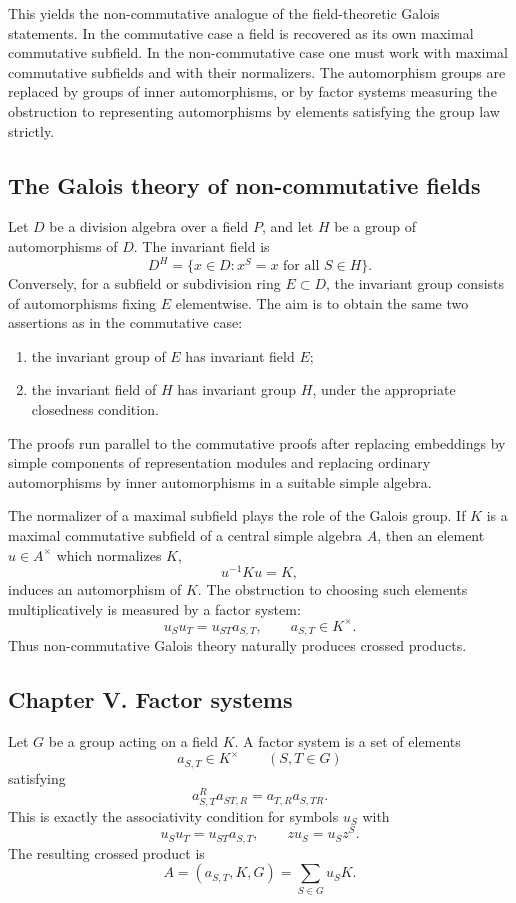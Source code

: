 \documentclass[12pt]{article}
\begin{document}
This yields the non-commutative analogue of the field-theoretic Galois statements. In the commutative case a field is recovered as its own maximal commutative subfield. In the non-commutative case one must work with maximal commutative subfields and with their normalizers. The automorphism groups are replaced by groups of inner automorphisms, or by factor systems measuring the obstruction to representing automorphisms by elements satisfying the group law strictly.

\subsection{The Galois theory of non-commutative fields}

Let \(D\) be a division algebra over a field \(P\), and let \(H\) be a group of automorphisms of \(D\). The invariant field is
\[
  D^H=\{x\in D:x^S=x\text{ for all }S\in H\}.
\]
Conversely, for a subfield or subdivision ring \(E\subset D\), the invariant group consists of automorphisms fixing \(E\) elementwise. The aim is to obtain the same two assertions as in the commutative case:
\begin{enumerate}[label=\arabic*.]
\item the invariant group of \(E\) has invariant field \(E\);
\item the invariant field of \(H\) has invariant group \(H\), under the appropriate closedness condition.
\end{enumerate}
The proofs run parallel to the commutative proofs after replacing embeddings by simple components of representation modules and replacing ordinary automorphisms by inner automorphisms in a suitable simple algebra.

The normalizer of a maximal subfield plays the role of the Galois group. If \(K\) is a maximal commutative subfield of a central simple algebra \(A\), then an element \(u\in A^{\times}\) which normalizes \(K\),
\[
  u^{-1}Ku=K,
\]
induces an automorphism of \(K\). The obstruction to choosing such elements multiplicatively is measured by a factor system:
\[
  u_Su_T=u_{ST}a_{S,T},\qquad a_{S,T}\in K^{\times}.
\]
Thus non-commutative Galois theory naturally produces crossed products.

\subsection{Chapter V. Factor systems}

Let \(G\) be a group acting on a field \(K\). A factor system is a set of elements
\[
  a_{S,T}\in K^{\times}\qquad(S,T\in G)
\]
satisfying
\[
  a_{S,T}^{R}a_{ST,R}=a_{T,R}a_{S,TR}.
\]
This is exactly the associativity condition for symbols \(u_S\) with
\[
  u_Su_T=u_{ST}a_{S,T},
  \qquad z u_S=u_Sz^S.
\]
The resulting crossed product is
\[
  A=(a_{S,T},K,G)=\sum_{S\in G}u_SK.
\]
\end{document}
